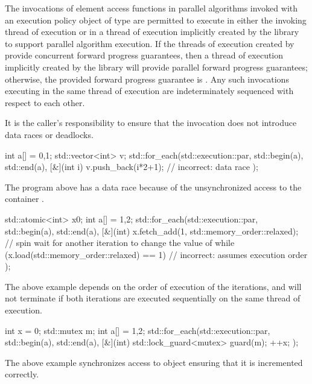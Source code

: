 \pnum
The invocations of element access functions in parallel algorithms invoked with
an execution policy object of type  are
permitted to execute in either the invoking thread of execution or in a
thread of execution implicitly
created by the library to support parallel algorithm execution.
If the threads of execution created by  provide concurrent
forward progress guarantees, then a thread of execution
implicitly created by the library will provide parallel forward progress guarantees;
otherwise, the provided forward progress guarantee is
.
Any such
invocations executing in the same thread of execution are indeterminately sequenced with
respect to each other.
\begin{note}
It is the caller's responsibility to ensure that the
invocation does not introduce data races or deadlocks.
\end{note}
\begin{example}
\begin{codeblock}
int a[] = {0,1};
std::vector<int> v;
std::for_each(std::execution::par, std::begin(a), std::end(a), [&](int i) {
  v.push_back(i*2+1); // incorrect: data race
});
\end{codeblock}
The program above has a data race because of the unsynchronized access to the
container .
\end{example}
\begin{example}
\begin{codeblock}
std::atomic<int> x{0};
int a[] = {1,2};
std::for_each(std::execution::par, std::begin(a), std::end(a), [&](int) {
  x.fetch_add(1, std::memory_order::relaxed);
  // spin wait for another iteration to change the value of 
  while (x.load(std::memory_order::relaxed) == 1) { } // incorrect: assumes execution order
});
\end{codeblock}
The above example depends on the order of execution of the iterations, and
will not terminate if both iterations are executed sequentially on the same
thread of execution.
\end{example}
\begin{example}
\begin{codeblock}
int x = 0;
std::mutex m;
int a[] = {1,2};
std::for_each(std::execution::par, std::begin(a), std::end(a), [&](int) {
  std::lock_guard<mutex> guard(m);
  ++x;
});
\end{codeblock}
The above example synchronizes access to object  ensuring that it is
incremented correctly.
\end{example}

